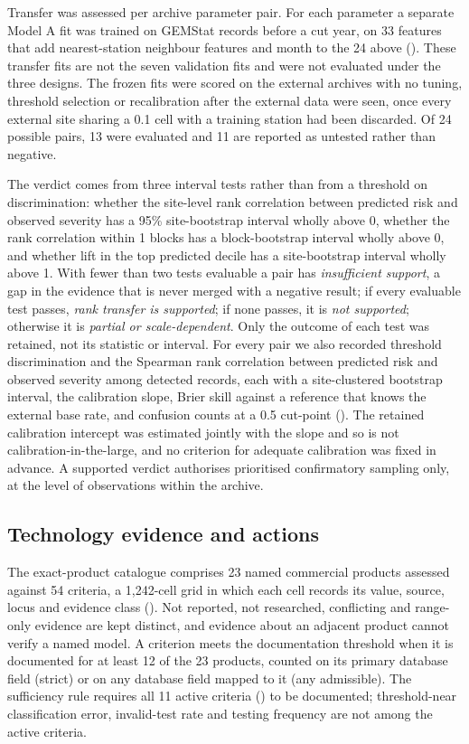 \documentclass[10pt,letterpaper]{article}
\begin{document}
Transfer was assessed per archive \texttimes{} parameter pair. For each parameter a separate Model A fit was trained on GEMStat records before a cut year, on 33 features that add nearest-station neighbour features and month to the 24 above (). These transfer fits are not the seven validation fits and were not evaluated under the three designs. The frozen fits were scored on the external archives with no tuning, threshold selection or recalibration after the external data were seen, once every external site sharing a 0.1\textdegree{} cell with a training station had been discarded. Of 24 possible pairs, 13 were evaluated and 11 are reported as untested rather than negative.

The verdict comes from three interval tests rather than from a threshold on discrimination: whether the site-level rank correlation between predicted risk and observed severity has a 95\% site-bootstrap interval wholly above 0, whether the rank correlation within 1\textdegree{} blocks has a block-bootstrap interval wholly above 0, and whether lift in the top predicted decile has a site-bootstrap interval wholly above 1. With fewer than two tests evaluable a pair has \textit{insufficient support}, a gap in the evidence that is never merged with a negative result; if every evaluable test passes, \textit{rank transfer is supported}; if none passes, it is \textit{not supported}; otherwise it is \textit{partial or scale-dependent}. Only the outcome of each test was retained, not its statistic or interval. For every pair we also recorded threshold discrimination and the Spearman rank correlation between predicted risk and observed severity among detected records, each with a site-clustered bootstrap interval, the calibration slope, Brier skill against a reference that knows the external base rate, and confusion counts at a 0.5 cut-point (). The retained calibration intercept was estimated jointly with the slope and so is not calibration-in-the-large, and no criterion for adequate calibration was fixed in advance. A supported verdict authorises prioritised confirmatory sampling only, at the level of observations within the archive.

\subsection*{Technology evidence and actions}

The exact-product catalogue comprises 23 named commercial products assessed against 54 criteria, a 1,242-cell grid in which each cell records its value, source, locus and evidence class (). Not reported, not researched, conflicting and range-only evidence are kept distinct, and evidence about an adjacent product cannot verify a named model. A criterion meets the documentation threshold when it is documented for at least 12 of the 23 products, counted on its primary database field (strict) or on any database field mapped to it (any admissible). The sufficiency rule requires all 11 active criteria () to be documented; threshold-near classification error, invalid-test rate and testing frequency are not among the active criteria.
\end{document}
